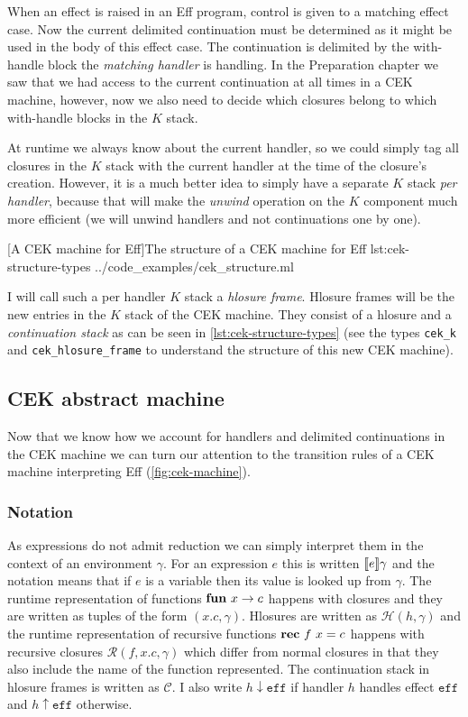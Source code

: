 \documentclass[class=article, crop=false]{standalone}
\begin{document}
When an effect is raised in an Eff program, control is given to a matching
effect case. Now the current delimited continuation must be determined as it
might be used in the body of this effect case. The continuation is delimited by
the with-handle block the \emph{matching handler} is handling. In the
Preparation chapter we saw that we had access to the current continuation at
all times in a CEK machine, however, now we also need to decide which closures
belong to which with-handle blocks in the $K$ stack.

At runtime we always know about the current handler, so we could simply tag all
closures in the $K$ stack with the current handler at the time of the closure's creation.
However, it is a much better idea to simply have a separate $K$ stack \emph{per handler},
because that will make the \emph{unwind} operation on the $K$ component
much more efficient (we will unwind handlers and not continuations one by one).

{[A CEK machine for Eff]The structure of a CEK machine for Eff}
{lst:cek-structure-types}
{../code_examples/cek_structure.ml}

I will call such a per handler $K$ stack a \emph{hlosure frame}. Hlosure frames will be the
new entries in the $K$ stack of the CEK machine. They consist of a hlosure and
a \emph{continuation stack} as can be seen in \autoref{lst:cek-structure-types}
(see the types \lstinline|cek_k| and \lstinline|cek_hlosure_frame| to understand the structure of this new CEK machine).

\subsection{CEK abstract machine}

Now that we know how we account for handlers and delimited continuations in the
CEK machine we can turn our attention to the transition rules of a CEK machine
interpreting Eff (\autoref{fig:cek-machine}).

\subsubsection{Notation}

As expressions do not admit reduction we can simply interpret them in the
context of an environment $\gamma$. For an expression $e$ this is written
$\llbracket e \rrbracket\gamma$ and the notation means that if $e$ is a variable then its
value is looked up from $\gamma$. The runtime representation of functions
$\mathbf{fun}\  x \to c$ happens with closures and they are written as tuples of the
form $(x.c, \gamma)$. Hlosures are written as $\mathcal{H}(h, \gamma)$ and the
runtime representation of recursive functions $\mathbf{rec}\  f\ x = c$ happens with
recursive closures $\mathcal{R}(f, x.c, \gamma)$ which differ from normal
closures in that they also include the name of the function represented.
The continuation stack in hlosure frames is written as $\mathcal{C}$. I also
write $h \downarrow \mathtt{eff}$ if handler $h$ handles effect $\mathtt{eff}$
and $h \uparrow \mathtt{eff}$ otherwise.
\end{document}
